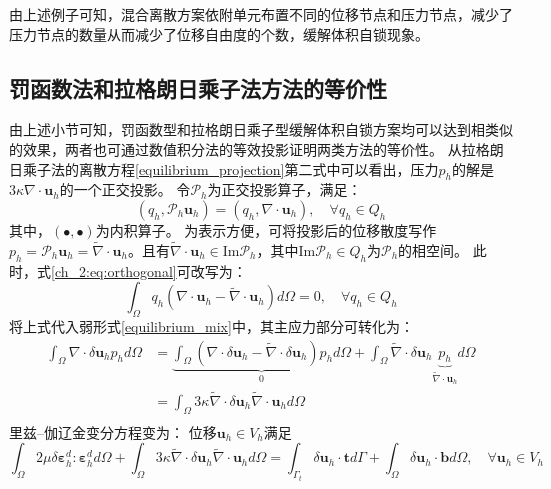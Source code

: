 由上述例子可知，混合离散方案依附单元布置不同的位移节点和压力节点，减少了压力节点的数量从而减少了位移自由度的个数，缓解体积自锁现象。
\subsection{罚函数法和拉格朗日乘子法方法的等价性}
由上述小节可知，罚函数型和拉格朗日乘子型缓解体积自锁方案均可以达到相类似的效果，两者也可通过数值积分法的等效投影证明两类方法的等价性。
从拉格朗日乘子法的离散方程\eqref{equilibrium_projection}第二式中可以看出，压力$p_h$的解是$3\kappa \nabla \cdot \boldsymbol u_h$的一个正交投影。
令$\mathcal P_h$为正交投影算子，满足：
\begin{equation}\label{ch_2:eq:orthogonal}
    (q_h,\mathcal P_h \boldsymbol u_h) = (q_h, \nabla \cdot \boldsymbol u_h), \quad \forall q_h \in Q_h
\end{equation}
其中，$(\bullet,\bullet)$为内积算子。
为表示方便，可将投影后的位移散度写作$p_h=\mathcal P_h \boldsymbol u_h = \tilde \nabla \cdot \boldsymbol u_h$。且有$\tilde \nabla \cdot \boldsymbol u_h \in \mathrm{Im} \mathcal P_h$，其中$\mathrm{Im} \mathcal P_h \in Q_h$为$\mathcal P_h$的相空间\cite{philippeg.2013}。
此时，式\eqref{ch_2:eq:orthogonal}可改写为：
\begin{equation}
    \int_\Omega q_h(\nabla \cdot \boldsymbol u_h - \tilde \nabla \cdot \boldsymbol u_h) d\Omega = 0, \quad \forall q_h \in Q_h
\end{equation}
将上式代入弱形式\eqref{equilibrium_mix}中，其主应力部分可转化为：
\begin{equation}\label{projection_mixed}
    \begin{split}
        \int_\Omega \nabla \cdot \delta \boldsymbol u_h p_h d\Omega &= \underbrace{\int_\Omega (\nabla \cdot \delta  \boldsymbol u_h - \tilde \nabla \cdot \delta \boldsymbol u_h) p_h d\Omega}_0 + \int_\Omega \tilde \nabla \cdot \delta \boldsymbol u_h \underbrace{p_h}_{\tilde \nabla \cdot \boldsymbol u_h} d\Omega \\
        &= \int_\Omega 3\kappa \tilde \nabla \cdot \delta \boldsymbol u_h \tilde \nabla \cdot \boldsymbol u_h d\Omega \\
    \end{split}
\end{equation}
里兹--伽辽金变分方程变为：
位移$\boldsymbol u_h \in V_h$满足
\begin{equation}
    \int_\Omega 2\mu \delta \boldsymbol \varepsilon^d_h : \boldsymbol \varepsilon^d_h d\Omega +
    \int_\Omega 3\kappa \tilde \nabla \cdot \delta \boldsymbol u_h \tilde \nabla \cdot \boldsymbol u_h d\Omega =
    \int_{\Gamma_t} \delta \boldsymbol u_h \cdot \boldsymbol t d\Gamma + \int_\Omega \delta \boldsymbol u_h \cdot \boldsymbol b d\Omega, \quad \forall \boldsymbol u_h \in V_h
\end{equation}

